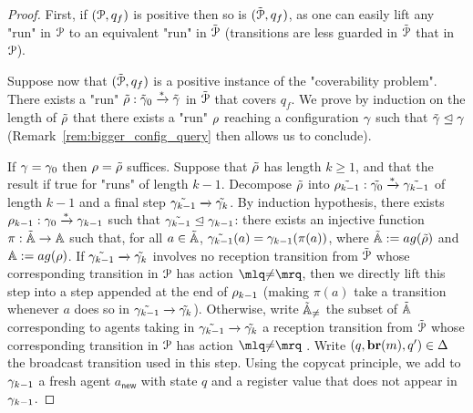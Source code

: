 \ifproofs
\begin{proof}
	First, if $(\mathcal{P}, q_f)$ is positive then so is $(\tilde{\mathcal{P}}, q_f)$, as one can easily lift any "run" in $\mathcal{P}$ to an equivalent "run" in $\tilde{\mathcal{P}}$ (transitions are less guarded  in $\tilde{\mathcal{P}}$ that in $\mathcal{P}$). 
	
	Suppose now that $(\tilde{\mathcal{P}}, q_f)$ is a positive instance of the "coverability problem". There exists a "run" $\tilde{\rho}: \tilde{\gamma}_0 \xrightarrow{*} \tilde{\gamma}$ in $\tilde{\mathcal{P}}$ that covers $q_f$. We prove by induction on the length of $\tilde{\rho}$ that there exists a "run" $\rho$ reaching a configuration $\gamma$ such that $\tilde{\gamma} \trianglelefteq \gamma$ (Remark~\ref{rem:bigger_config_query} then allows us to conclude). 
	
	If $\gamma = \gamma_0$ then $\rho = \tilde{\rho}$ suffices. Suppose that $\tilde{\rho}$ has length $k \geq 1$, and that the result if true for "runs" of length $k-1$. Decompose $\tilde{\rho}$ into $\tilde{\rho_{k-1}}: \tilde{\gamma_0} \xrightarrow{*} \tilde{\gamma_{k-1}}$ of length $k-1$ and a final step $\tilde{\gamma_{k-1}} \xrightarrow{} \tilde{\gamma_k}$. 
	By induction hypothesis, there exists $\rho_{k-1}: \gamma_0 \xrightarrow{*} \gamma_{k-1}$ such that $\tilde{\gamma_{k-1}} \trianglelefteq \gamma_{k-1}$: there exists an injective function $\pi : \tilde{\mathbb{A}} \rightarrow \mathbb{A}$
	such that, for all $a \in \tilde{\mathbb{A}}$, $\tilde{\gamma_{k-1}}(a) = \gamma_{k-1}(\pi(a))$, where $\tilde{\agents} := \agentsof{\tilde{\run}}$ and $\agents := \agentsof{\run}$. If $\tilde{\gamma_{k-1}} \xrightarrow{} \tilde{\gamma_k}$ involves no reception transition from $\tilde{\mathcal{P}}$ whose corresponding transition in $\mathcal{P}$ has action $\quotemarks{\diseqtestact}$, then we directly lift this step into a step appended at the end of $\rho_{k-1}$ (making $\pi(a)$ take a transition whenever $a$ does so in $\tilde{\gamma_{k-1}} \xrightarrow{} \tilde{\gamma_k}$). Otherwise, write $\tilde{\mathbb{A}}_{{\ne}}$ the subset of $\tilde{\mathbb{A}}$ corresponding to agents taking in $\tilde{\gamma_{k-1}} \xrightarrow{} \tilde{\gamma_k}$ a reception transition from $\tilde{\mathcal{P}}$ whose corresponding transition in $\mathcal{P}$ has action $\quotemarks{\diseqtestact}$ . Write $(q, \textbf{br}(m), q') \in \Delta$ the broadcast transition used in this step.  Using the copycat principle, we add to $\gamma_{k-1}$ a fresh agent $a_{\mathsf{new}}$ with state $q$ and a register value that does not appear in $\gamma_{k-1}$. 

\end{proof}
